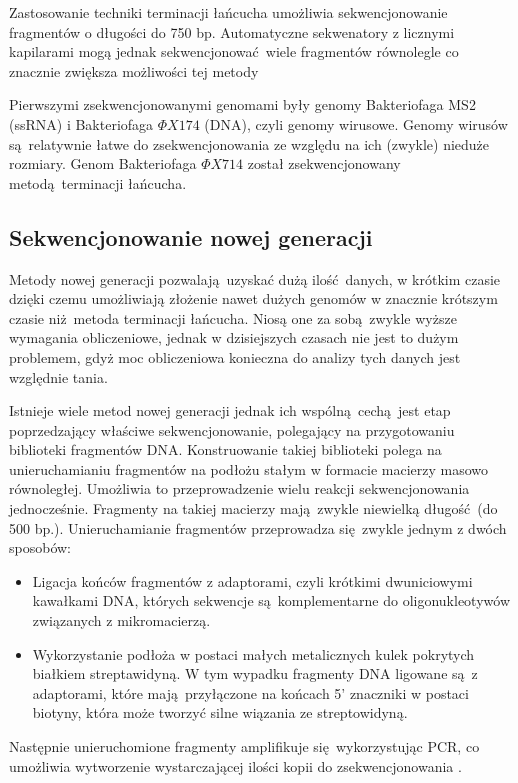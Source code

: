 \documentclass[two column, twoside, a4paper]{article}
\begin{document}
Zastosowanie techniki terminacji łańcucha umożliwia sekwencjonowanie fragmentów o długości do 750 bp. Automatyczne sekwenatory z licznymi kapilarami mogą jednak sekwencjonować wiele fragmentów równolegle co znacznie zwiększa możliwości tej metody \autocite{Brown2019}

Pierwszymi zsekwencjonowanymi genomami były genomy Bakteriofaga MS2 (ssRNA) i Bakteriofaga $\Phi X174$ \autocite{Sanger1978} (DNA), czyli genomy wirusowe. Genomy wirusów są relatywnie łatwe do zsekwencjonowania ze względu na ich (zwykle) nieduże rozmiary. Genom Bakteriofaga $\Phi X714$ został zsekwencjonowany metodą terminacji łańcucha.

\subsection{Sekwencjonowanie nowej generacji}

Metody nowej generacji pozwalają uzyskać dużą ilość danych, w krótkim czasie dzięki czemu umożliwiają złożenie nawet dużych genomów w znacznie krótszym czasie niż metoda terminacji łańcucha. Niosą one za sobą zwykle wyższe wymagania obliczeniowe, jednak w dzisiejszych czasach nie jest to dużym problemem, gdyż moc obliczeniowa konieczna do analizy tych danych jest względnie tania.

Istnieje wiele metod nowej generacji jednak ich wspólną cechą jest etap poprzedzający właściwe sekwencjonowanie, polegający na przygotowaniu biblioteki fragmentów DNA. Konstruowanie takiej biblioteki polega na unieruchamianiu fragmentów na podłożu stałym w formacie macierzy masowo równoległej. Umożliwia to przeprowadzenie wielu reakcji sekwencjonowania jednocześnie. Fragmenty na takiej macierzy mają zwykle niewielką długość (do 500 bp.). Unieruchamianie fragmentów przeprowadza się zwykle jednym z dwóch sposobów:
\begin{itemize}
	\item Ligacja końców fragmentów z adaptorami, czyli krótkimi dwuniciowymi kawałkami DNA, których sekwencje są komplementarne do oligonukleotywów związanych z mikromacierzą.
	\item Wykorzystanie podłoża w postaci małych metalicznych kulek pokrytych białkiem streptawidyną. W tym wypadku fragmenty DNA ligowane są z adaptorami, które mają przyłączone na końcach 5' znaczniki w postaci biotyny, która może tworzyć silne wiązania ze streptowidyną.
\end{itemize}
Następnie unieruchomione fragmenty amplifikuje się wykorzystując PCR, co umożliwia wytworzenie wystarczającej ilości kopii do zsekwencjonowania \autocite{Godwin2016}\autocite{Brown2019}.
\end{document}
